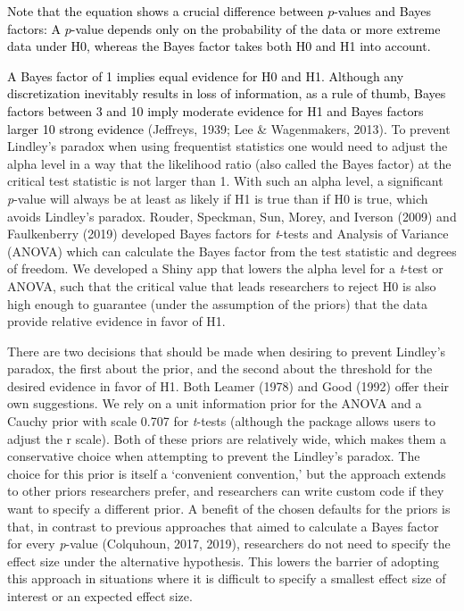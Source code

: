 \documentclass[
  english,
  ,man, a4paper,floatsintext]{apa6}
\begin{document}
\textcolor{black}{Note that the equation shows a crucial difference between $p$-values and Bayes factors: A $p$-value depends only on the probability of the data or more extreme data under H0, whereas the Bayes factor takes both H0 and H1 into account.}

\textcolor{black}{A Bayes factor of 1 implies equal evidence for H0 and H1. Although any discretization inevitably results in loss of information, as a rule of thumb, Bayes factors between 3 and 10 imply moderate evidence for H1 and Bayes factors larger 10 strong evidence} (Jeffreys, 1939; Lee \& Wagenmakers, 2013). To prevent Lindley's paradox when using frequentist statistics one would need to adjust the alpha level in a way that the likelihood ratio (also called the Bayes factor) at the critical test statistic is not larger than 1. With such an alpha level, a significant \emph{p}-value will always be at least as likely if H1 is true than if H0 is true, which avoids Lindley's paradox. Rouder, Speckman, Sun, Morey, and Iverson (2009) and Faulkenberry (2019) developed Bayes factors for \emph{t}-tests and Analysis of Variance (ANOVA) which can calculate the Bayes factor from the test statistic and degrees of freedom. We developed a Shiny app that lowers the alpha level for a \emph{t}-test or ANOVA, such that the critical value that leads researchers to reject H0 is also high enough to guarantee (under the assumption of the priors) that the data provide relative evidence in favor of H1.

There are two decisions that should be made when desiring to prevent Lindley's paradox, the first about the prior, and the second about the threshold for the desired evidence in favor of H1. Both Leamer (1978) and Good (1992) offer their own suggestions. We rely on a unit information prior for the ANOVA and a Cauchy prior with scale 0.707 for \emph{t}-tests (although the package allows users to adjust the r scale). Both of these priors are relatively wide, which makes them a conservative choice when attempting to prevent the Lindley's paradox. The choice for this prior is itself a `convenient convention,' but the approach extends to other priors researchers prefer, and researchers can write custom code if they want to specify a different prior. A benefit of the chosen defaults for the priors is that, in contrast to previous approaches that aimed to calculate a Bayes factor for every \emph{p}-value (Colquhoun, 2017, 2019), researchers do not need to specify the effect size under the alternative hypothesis. This lowers the barrier of adopting this approach in situations where it is difficult to specify a smallest effect size of interest or an expected effect size.
\end{document}
